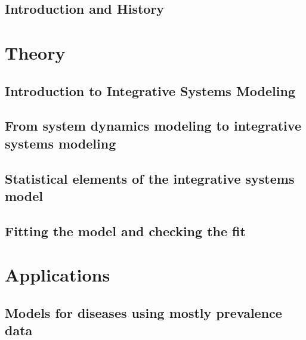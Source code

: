 \tableofcontents

\chapter[Introduction]{Introduction and History}
\label{chapter:introduction}






\part{Theory}
\chapter[Introduction to ISM]{Introduction to Integrative Systems Modeling}
\label{chapter:theory-introduction}

\chapter[System dynamics model]{From system dynamics modeling to integrative systems modeling}
\label{chapter:system-dynamics}


\chapter[Statistical model]{Statistical elements of the integrative systems model}
\label{chapter:statistical-model}




\chapter[Model fitting]{Fitting the model and checking the fit}
\label{chapter:model-fitting}




\part{Applications}
\chapter[Mostly Prevalence]{Models for diseases using mostly prevalence data}
\label{chapter:practice-mostly_prevalence}

